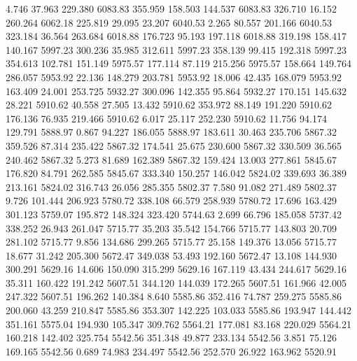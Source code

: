    4.746   37.963  229.380      6083.83
 355.959  158.503  144.537      6083.83
 326.710   16.152  260.264      6062.18
 225.819   29.095   23.207      6040.53
   2.265   80.557  201.166      6040.53
 323.184   36.564  263.684      6018.88
 176.723   95.193  197.118      6018.88
 319.198  158.417  140.167      5997.23
 300.236   35.985  312.611      5997.23
 358.139   99.415  192.318      5997.23
 354.613  102.781  151.149      5975.57
 177.114   87.119  215.256      5975.57
 158.664  149.764  286.057      5953.92
  22.136  148.279  203.781      5953.92
  18.006   42.435  168.079      5953.92
 163.409   24.001  253.725      5932.27
 300.096  142.355   95.864      5932.27
 170.151  145.632   28.221      5910.62
  40.558   27.505   13.432      5910.62
 353.972   88.149  191.220      5910.62
 176.136   76.935  219.466      5910.62
   6.017   25.117  252.230      5910.62
  11.756   94.174  129.791      5888.97
   0.867   94.227  186.055      5888.97
 183.611   30.463  235.706      5867.32
 359.526   87.314  235.422      5867.32
 174.541   25.675  230.600      5867.32
 330.509   36.565  240.462      5867.32
   5.273   81.689  162.389      5867.32
 159.424   13.003  277.861      5845.67
 176.820   84.791  262.585      5845.67
 333.340  150.257  146.042      5824.02
 339.693   36.389  213.161      5824.02
 316.743   26.056  285.355      5802.37
   7.580   91.082  271.489      5802.37
   9.726  101.444  206.923      5780.72
 338.108   66.579  258.939      5780.72
  17.696  163.429  301.123      5759.07
 195.872  148.324  323.420      5744.63
   2.699   66.796  185.058      5737.42
 338.252   26.943  261.047      5715.77
  35.203   35.542  154.766      5715.77
 143.803   20.709  281.102      5715.77
   9.856  134.686  299.265      5715.77
  25.158  149.376   13.056      5715.77
  18.677   31.242  205.300      5672.47
 349.038   53.493  192.160      5672.47
  13.108  144.930  300.291      5629.16
  14.606  150.090  315.299      5629.16
 167.119   43.434  244.617      5629.16
  35.311  160.422  191.242      5607.51
 344.120  144.039  172.265      5607.51
 161.966   42.005  247.322      5607.51
 196.262  140.384    8.640      5585.86
 352.416   74.787  259.275      5585.86
 200.060   43.259  210.847      5585.86
 353.307  142.225  103.033      5585.86
 193.947  144.442  351.161      5575.04
 194.930  105.347  309.762      5564.21
 177.081   83.168  220.029      5564.21
 160.218  142.402  325.754      5542.56
 351.348   49.877  233.134      5542.56
   3.851   75.126  169.165      5542.56
   0.689   74.983  234.497      5542.56
 252.570   26.922  163.962      5520.91
